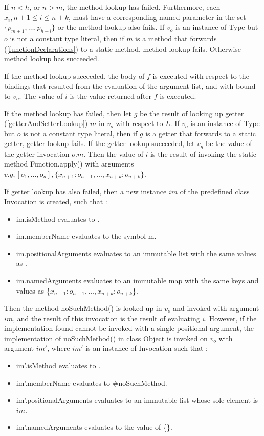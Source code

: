 \documentclass{article}
\newcommand{\code}[1]{{\sf #1}}
\begin{document}
\LMHash{}
If  $n < h$, or $n > m$, the method lookup has failed. Furthermore, each $x_i, n+1 \le i \le n+k$,  must have a corresponding named parameter in the set $\{p_{m+1}, \ldots, p_{h+l}\}$ or the method lookup also fails.  If $v_o$ is an instance of \code{Type} but $o$ is not a constant type literal, then if $m$ is a method that forwards (\ref{functionDeclarations}) to a static method, method lookup fails. Otherwise method lookup has succeeded.

\LMHash{}
If the method lookup succeeded, the body of $f$ is executed with respect to the bindings that resulted from the evaluation of the argument list, and with \THIS{} bound to $v_o$. The value of $i$ is the value returned after $f$ is executed.

\LMHash{}
If the method lookup has failed, then let $g$ be the result of looking up getter (\ref{getterAndSetterLookup}) $m$ in $v_o$ with respect to $L$. 
If $v_o$ is an instance of \code{Type} but $o$ is not a constant type literal, then if $g$ is a getter that forwards to a static getter, getter lookup fails.
If the getter lookup succeeded, let $v_g$ be the value of the getter invocation $o.m$. Then the value of $i$ is the result of invoking 
the static method \code{Function.apply()} with arguments $v.g, [o_1, \ldots , o_n], \{x_{n+1}: o_{n+1}, \ldots , x_{n+k}: o_{n+k}\}$.

\LMHash{}
If  getter lookup has also failed, then a new instance $im$  of the predefined class  \code{Invocation}  is created, such that :
\begin{itemize}
\item  \code{im.isMethod} evaluates to \code{\TRUE{}}.
\item  \code{im.memberName} evaluates to the symbol \code{m}.
\item \code{im.positionalArguments} evaluates to an immutable list with the same values as  \code{[$o_1, \ldots, o_n$]}.
\item \code{im.namedArguments} evaluates to an immutable map with the same keys and values as \code{\{$x_{n+1}: o_{n+1}, \ldots, x_{n+k} : o_{n+k}$\}}.
\end{itemize}

\LMHash{}
Then the method \code{noSuchMethod()} is looked up in $v_o$ and invoked with argument $im$, and the result of this invocation is the result of evaluating $i$. However, if the implementation found cannot be invoked with a single positional argument, the implementation  of \code{noSuchMethod()} in class \code{Object} is invoked on $v_o$ with argument $im'$, where $im'$ is an instance of \code{Invocation} such that :
\begin{itemize}
\item  \code{im'.isMethod} evaluates to \code{\TRUE{}}.
\item  \code{im'.memberName} evaluates to \code{\#noSuchMethod}.
\item \code{im'.positionalArguments} evaluates to an immutable list whose sole element is  $im$.
\item \code{im'.namedArguments} evaluates to the value of \code{\CONST{} \{\}}.
\end{itemize}
\end{document}
